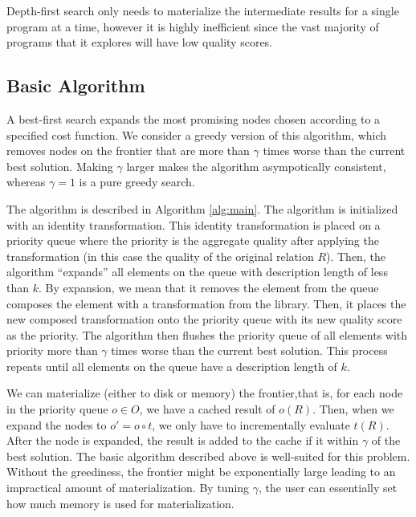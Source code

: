 
 Depth-first search only needs to materialize the intermediate results for a single program at a time, however it is highly inefficient since the vast majority of programs that it explores will have low quality scores.  

\subsection{Basic Algorithm}
A best-first search expands the most promising nodes chosen according to a specified cost function.
We consider a greedy version of this algorithm, which removes nodes on the frontier that are more than $\gamma$ times worse than the current best solution.
Making $\gamma$ larger makes the algorithm asympotically consistent, whereas $\gamma=1$ is a pure greedy search.

The algorithm is described in Algorithm \ref{alg:main}.
The algorithm is initialized with an identity transformation. This identity transformation is placed on a priority queue where the priority is the aggregate quality after applying the transformation (in this case the quality of the original relation $R$).
Then, the algorithm ``expands'' all elements on the queue with description length of less than $k$.
By expansion, we mean that it removes the element from the queue composes the element with a transformation from the library.
Then, it places the new composed transformation onto the priority queue with its new quality score as the priority.
The algorithm then flushes the priority queue of all elements with priority more than $\gamma$ times worse than the current best solution.
This process repeats until all elements on the queue have a description length of $k$.

We can materialize (either to disk or memory) the frontier,that is, for each node in the priority queue $o \in O$, we have a cached result of $o(R)$. 
Then, when we expand the nodes to $o' = o \circ t$, we only have to incrementally evaluate $t(R)$.
After the node is expanded, the result is added to the cache if it within $\gamma$ of the best solution.
The basic algorithm described above is well-suited for this problem.
Without the greediness, the frontier might be exponentially large leading to an impractical amount of materialization.
By tuning $\gamma$, the user can essentially set how much memory is used for materialization.

